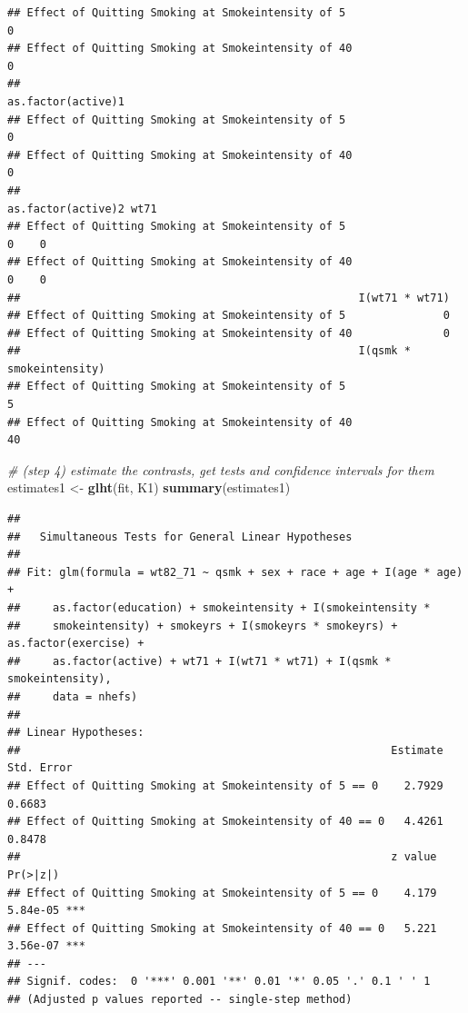 \documentclass[
  10pt,
]{book}
\newenvironment{Shaded}{\begin{snugshade}}{\end{snugshade}}
\newcommand{\CommentTok}[1]{\textcolor[rgb]{0.56,0.35,0.01}{\textit{#1}}}
\newcommand{\KeywordTok}[1]{\textcolor[rgb]{0.13,0.29,0.53}{\textbf{#1}}}
\newcommand{\NormalTok}[1]{#1}
\newcommand{\StringTok}[1]{\textcolor[rgb]{0.31,0.60,0.02}{#1}}
\begin{document}
\begin{verbatim}
## Effect of Quitting Smoking at Smokeintensity of 5                     0
## Effect of Quitting Smoking at Smokeintensity of 40                    0
##                                                    as.factor(active)1
## Effect of Quitting Smoking at Smokeintensity of 5                   0
## Effect of Quitting Smoking at Smokeintensity of 40                  0
##                                                    as.factor(active)2 wt71
## Effect of Quitting Smoking at Smokeintensity of 5                   0    0
## Effect of Quitting Smoking at Smokeintensity of 40                  0    0
##                                                    I(wt71 * wt71)
## Effect of Quitting Smoking at Smokeintensity of 5               0
## Effect of Quitting Smoking at Smokeintensity of 40              0
##                                                    I(qsmk * smokeintensity)
## Effect of Quitting Smoking at Smokeintensity of 5                         5
## Effect of Quitting Smoking at Smokeintensity of 40                       40
\end{verbatim}

\begin{Shaded}
\begin{Highlighting}[]
\CommentTok{\# (step 4) estimate the contrasts, get tests and confidence intervals for them}
\NormalTok{estimates1 \textless{}{-}}\StringTok{ }\KeywordTok{glht}\NormalTok{(fit, K1)}
  \KeywordTok{summary}\NormalTok{(estimates1)}
\end{Highlighting}
\end{Shaded}

\begin{verbatim}
## 
##   Simultaneous Tests for General Linear Hypotheses
## 
## Fit: glm(formula = wt82_71 ~ qsmk + sex + race + age + I(age * age) + 
##     as.factor(education) + smokeintensity + I(smokeintensity * 
##     smokeintensity) + smokeyrs + I(smokeyrs * smokeyrs) + as.factor(exercise) + 
##     as.factor(active) + wt71 + I(wt71 * wt71) + I(qsmk * smokeintensity), 
##     data = nhefs)
## 
## Linear Hypotheses:
##                                                         Estimate Std. Error
## Effect of Quitting Smoking at Smokeintensity of 5 == 0    2.7929     0.6683
## Effect of Quitting Smoking at Smokeintensity of 40 == 0   4.4261     0.8478
##                                                         z value Pr(>|z|)    
## Effect of Quitting Smoking at Smokeintensity of 5 == 0    4.179 5.84e-05 ***
## Effect of Quitting Smoking at Smokeintensity of 40 == 0   5.221 3.56e-07 ***
## ---
## Signif. codes:  0 '***' 0.001 '**' 0.01 '*' 0.05 '.' 0.1 ' ' 1
## (Adjusted p values reported -- single-step method)
\end{verbatim}
\end{document}
